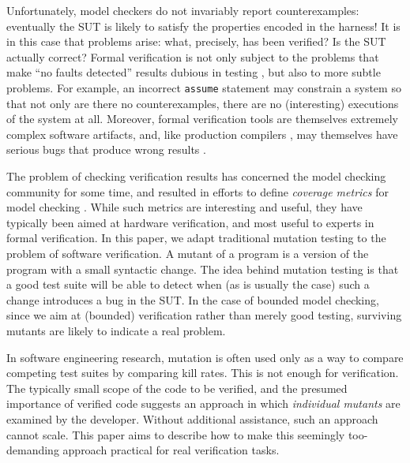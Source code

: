 \documentclass[conference]{IEEEtran}
\begin{document}
Unfortunately, model checkers do not invariably report
counterexamples: eventually the SUT is likely to satisfy the
properties encoded in the harness!  It is in this case that problems
arise: what, precisely, has been verified?  Is the SUT actually correct?
Formal verification is not only subject to the problems that make
``no faults detected'' results dubious in testing \cite{WODA09,CovDisc}, but
also to more subtle problems.  For example, an incorrect {\tt assume}
statement may constrain a system so that not only are there no
counterexamples, there are no (interesting) executions of the system at
all.  Moreover, formal verification tools are themselves extremely
complex software artifacts, and, like production compilers \cite{csmith}, may
themselves have serious bugs that produce wrong results \cite{statanalbug}.

The problem of checking verification results has concerned the model checking community for some time, and resulted in efforts to define \emph{coverage
  metrics} for model checking \cite{Hoskote,PracticalCov}.  While such metrics are interesting and
useful, they have typically been aimed at hardware
verification, and most useful to experts in
formal verification.  In this paper, we adapt traditional mutation
testing \cite{mutation1,mutation2} to the problem of software
verification.  A mutant of a program is a version of the program with
a small syntactic change.  The idea behind mutation testing
is that a good test suite will be able to detect when (as is usually
the case) such a change introduces a bug in the SUT.  In the case of
bounded model checking, since we aim at (bounded) verification rather
than merely good testing, surviving mutants are
likely to indicate a real problem.

In software engineering research, mutation is often used only as a way
to compare competing test suites by comparing kill rates\cite{ISSTA13,TOSEM14}.  This is
not enough for verification.  The typically small scope of the code to
be verified, and the presumed importance of verified code
suggests an approach in which \emph{individual mutants}
are examined by the developer.  Without additional assistance, such an
approach cannot scale.  This paper aims to describe how to make this
seemingly too-demanding approach practical for real verification
tasks.
\end{document}
